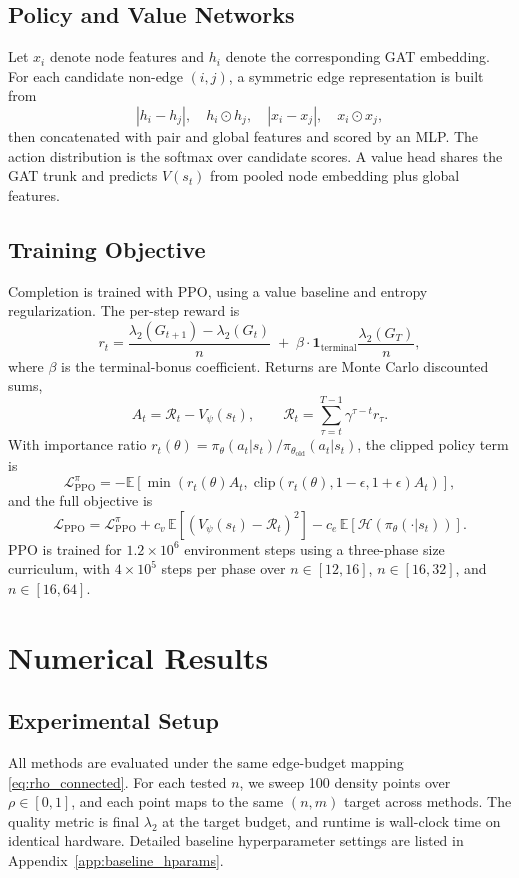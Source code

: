 \documentclass[letterpaper, 10 pt, conference]{ieeeconf}  %
\newcommand{\1}{\mathbf{1}}
\newcommand{\0}{\mathbf{0}}
\begin{document}
\subsection{Policy and Value Networks}
Let \(x_i\) denote node features and \(h_i\) denote the corresponding GAT embedding.
For each candidate non-edge \((i,j)\), a symmetric edge representation is built from
\[
|h_i-h_j|,\quad h_i\odot h_j,\quad |x_i-x_j|,\quad x_i\odot x_j,
\]
then concatenated with pair and global features and scored by an MLP.
The action distribution is the softmax over candidate scores.
A value head shares the GAT trunk and predicts \(V(s_t)\) from pooled node embedding plus global features.

\subsection{Training Objective}
Completion is trained with PPO, using a value baseline and entropy regularization.
The per-step reward is
\[
r_t=\frac{\lambda_2(G_{t+1})-\lambda_2(G_t)}{n}
\;+\;
\beta\cdot \mathbf{1}_{\mathrm{terminal}}\frac{\lambda_2(G_T)}{n},
\]
where \(\beta\) is the terminal-bonus coefficient.
Returns are Monte Carlo discounted sums,
\[
A_t=\mathcal{R}_t-V_\psi(s_t), \qquad
\mathcal{R}_t=\sum_{\tau=t}^{T-1}\gamma^{\tau-t}r_\tau .
\]
With importance ratio \(r_t(\theta)=\pi_\theta(a_t|s_t)/\pi_{\theta_{\mathrm{old}}}(a_t|s_t)\), the clipped policy term is
\[
\mathcal L_{\mathrm{PPO}}^{\pi}
=
-\mathbb E\!\left[
\min\!\left(
r_t(\theta)A_t,\;
\mathrm{clip}\!\left(r_t(\theta),1-\epsilon,1+\epsilon\right)A_t
\right)\right],
\]
and the full objective is
\[
\mathcal L_{\mathrm{PPO}}
=
\mathcal L_{\mathrm{PPO}}^{\pi}
+c_v\,\mathbb E\!\left[(V_\psi(s_t)-\mathcal{R}_t)^2\right]
-c_e\,\mathbb E\!\left[\mathcal H(\pi_\theta(\cdot|s_t))\right].
\]
PPO is trained for \(1.2\times10^6\) environment steps using a three-phase size curriculum, with \(4\times10^5\) steps per phase over \(n\in[12,16]\), \(n\in[16,32]\), and \(n\in[16,64]\).

\section{Numerical Results}
\subsection{Experimental Setup}
All methods are evaluated under the same edge-budget mapping \eqref{eq:rho_connected}.
For each tested \(n\), we sweep 100 density points over \(\rho\in[0,1]\), and each point maps to the same \((n,m)\) target across methods.
The quality metric is final \(\lambda_2\) at the target budget, and runtime is wall-clock time on identical hardware.
Detailed baseline hyperparameter settings are listed in Appendix~\ref{app:baseline_hparams}.
\end{document}
